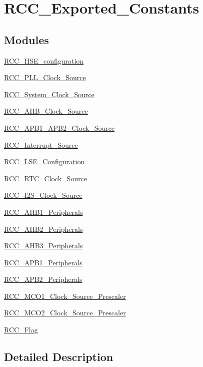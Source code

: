 \hypertarget{group___r_c_c___exported___constants}{\section{R\-C\-C\-\_\-\-Exported\-\_\-\-Constants}
\label{group___r_c_c___exported___constants}
}
\subsection*{Modules}
\begin{DoxyCompactItemize}
\item 
\hyperlink{group___r_c_c___h_s_e__configuration}{R\-C\-C\-\_\-\-H\-S\-E\-\_\-configuration}
\item 
\hyperlink{group___r_c_c___p_l_l___clock___source}{R\-C\-C\-\_\-\-P\-L\-L\-\_\-\-Clock\-\_\-\-Source}
\item 
\hyperlink{group___r_c_c___system___clock___source}{R\-C\-C\-\_\-\-System\-\_\-\-Clock\-\_\-\-Source}
\item 
\hyperlink{group___r_c_c___a_h_b___clock___source}{R\-C\-C\-\_\-\-A\-H\-B\-\_\-\-Clock\-\_\-\-Source}
\item 
\hyperlink{group___r_c_c___a_p_b1___a_p_b2___clock___source}{R\-C\-C\-\_\-\-A\-P\-B1\-\_\-\-A\-P\-B2\-\_\-\-Clock\-\_\-\-Source}
\item 
\hyperlink{group___r_c_c___interrupt___source}{R\-C\-C\-\_\-\-Interrupt\-\_\-\-Source}
\item 
\hyperlink{group___r_c_c___l_s_e___configuration}{R\-C\-C\-\_\-\-L\-S\-E\-\_\-\-Configuration}
\item 
\hyperlink{group___r_c_c___r_t_c___clock___source}{R\-C\-C\-\_\-\-R\-T\-C\-\_\-\-Clock\-\_\-\-Source}
\item 
\hyperlink{group___r_c_c___i2_s___clock___source}{R\-C\-C\-\_\-\-I2\-S\-\_\-\-Clock\-\_\-\-Source}
\item 
\hyperlink{group___r_c_c___a_h_b1___peripherals}{R\-C\-C\-\_\-\-A\-H\-B1\-\_\-\-Peripherals}
\item 
\hyperlink{group___r_c_c___a_h_b2___peripherals}{R\-C\-C\-\_\-\-A\-H\-B2\-\_\-\-Peripherals}
\item 
\hyperlink{group___r_c_c___a_h_b3___peripherals}{R\-C\-C\-\_\-\-A\-H\-B3\-\_\-\-Peripherals}
\item 
\hyperlink{group___r_c_c___a_p_b1___peripherals}{R\-C\-C\-\_\-\-A\-P\-B1\-\_\-\-Peripherals}
\item 
\hyperlink{group___r_c_c___a_p_b2___peripherals}{R\-C\-C\-\_\-\-A\-P\-B2\-\_\-\-Peripherals}
\item 
\hyperlink{group___r_c_c___m_c_o1___clock___source___prescaler}{R\-C\-C\-\_\-\-M\-C\-O1\-\_\-\-Clock\-\_\-\-Source\-\_\-\-Prescaler}
\item 
\hyperlink{group___r_c_c___m_c_o2___clock___source___prescaler}{R\-C\-C\-\_\-\-M\-C\-O2\-\_\-\-Clock\-\_\-\-Source\-\_\-\-Prescaler}
\item 
\hyperlink{group___r_c_c___flag}{R\-C\-C\-\_\-\-Flag}
\end{DoxyCompactItemize}


\subsection{Detailed Description}
